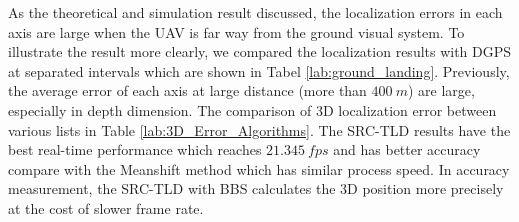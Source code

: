 \begin{table}[!th]
	\centering
	\caption{Eight Experiment Results in Different Weather Condition}
	\label{lab:eight_ground_landing}
\end{table}

As the theoretical and simulation result discussed, the localization errors in each axis are large when the UAV is far way from the ground visual system. To illustrate the result more clearly, we compared the localization results with DGPS at separated intervals which are shown in Tabel \ref{lab:ground_landing}. Previously, the average error of each axis at large distance (more than $400\ m$) are large, especially in depth dimension. The comparison of 3D localization error between various lists in Table \ref{lab:3D_Error_Algorithms}. The SRC-TLD results have the best real-time performance which reaches $21.345\ fps$ and has better accuracy compare with the Meanshift method which has similar process speed. In accuracy measurement, the SRC-TLD with BBS calculates the 3D position more precisely at the cost of slower frame rate.


